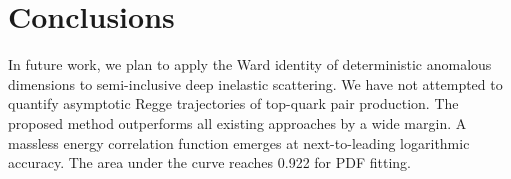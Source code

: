 \section{Conclusions}\label{sec:conclusions}

In future work, we plan to apply the Ward identity of deterministic
anomalous dimensions to semi-inclusive deep inelastic scattering. We
have not attempted to quantify asymptotic Regge trajectories of
top-quark pair production. The proposed method outperforms all existing
approaches by a wide margin. A massless energy correlation function
emerges at next-to-leading logarithmic accuracy. The area under the
curve reaches 0.922 for PDF fitting.

